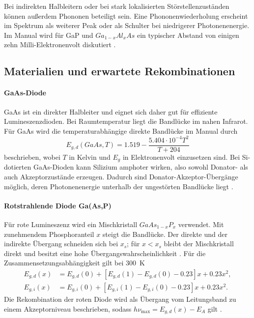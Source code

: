 \documentclass{article}
\begin{document}
Bei indirekten Halbleitern oder bei stark lokalisierten Störstellenzuständen können außerdem Phononen beteiligt sein. Eine Phononenwiederholung erscheint im Spektrum als weiterer Peak oder als Schulter bei niedrigerer Photonenenergie. Im Manual wird für GaP und $Ga_{1-x}Al_xAs$ ein typischer Abstand von einigen zehn Milli-Elektronenvolt diskutiert \cite[S.~22, S.~26]{manual}.

\subsection{Materialien und erwartete Rekombinationen}

\paragraph{GaAs-Diode}
GaAs ist ein direkter Halbleiter und eignet sich daher gut für effiziente Lumineszenzdioden. Bei Raumtemperatur liegt die Bandlücke im nahen Infrarot. Für GaAs wird die temperaturabhängige direkte Bandlücke im Manual durch \cite[S.~19]{manual}
\begin{equation}
    E_{g,d}(GaAs,T)=1.519-\frac{5.404\cdot10^{-4}T^2}{T+204}
    \label{eq:eg_gaas}
\end{equation}
beschrieben, wobei $T$ in Kelvin und $E_g$ in Elektronenvolt einzusetzen sind. Bei Si-dotierten GaAs-Dioden kann Silizium amphoter wirken, also sowohl Donator- als auch Akzeptorzustände erzeugen. Dadurch sind Donator-Akzeptor-Übergänge möglich, deren Photonenenergie unterhalb der ungestörten Bandlücke liegt \cite[S.~17--19]{manual}.

\paragraph{Rotstrahlende Diode Ga(As,P)}
Für rote Lumineszenz wird ein Mischkristall $GaAs_{1-x}P_x$ verwendet. Mit zunehmendem Phosphoranteil $x$ steigt die Bandlücke. Der direkte und der indirekte Übergang schneiden sich bei $x_s$; für $x<x_s$ bleibt der Mischkristall direkt und besitzt eine hohe Übergangswahrscheinlichkeit \cite[S.~19--20]{manual}. Für die Zusammensetzungsabhängigkeit gilt bei \SI{300}{\kelvin}
\begin{align}
    E_{g,d}(x)&=E_{g,d}(0)+[E_{g,d}(1)-E_{g,d}(0)-0.23]x+0.23x^2,
    \label{eq:gaasp_direct}\\
    E_{g,i}(x)&=E_{g,i}(0)+[E_{g,i}(1)-E_{g,i}(0)-0.23]x+0.23x^2.
    \label{eq:gaasp_indirect}
\end{align}
Die Rekombination der roten Diode wird als Übergang vom Leitungsband zu einem Akzeptorniveau beschrieben, sodass $h\nu_\mathrm{max}=E_{g,d}(x)-E_A$ gilt \cite[S.~20]{manual}.
\end{document}

